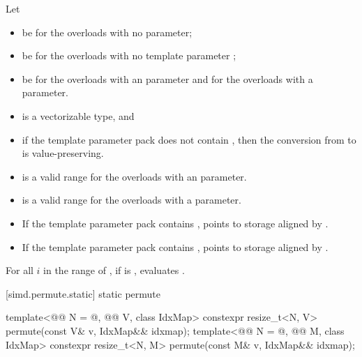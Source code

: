 \begin{itemdescr}
\pnum
Let
\begin{itemize}
 \item
    be  for the
   overloads with no  parameter;
 \item
    be  for the overloads with no
   template parameter ;
 \item
    be  for the overloads with an 
   parameter and  for the overloads with a 
   parameter.
\end{itemize}

\pnum
\mandates
\begin{itemize}
 \item
    is a vectorizable type, and
 \item
   if the template parameter pack  does not contain
   , then the conversion from  to
    is value-preserving.
\end{itemize}

\pnum
\expects
\begin{itemize}
 \item
    is a valid range for the overloads with an
    parameter.
 \item
    is a valid range for the overloads with a 
   parameter.
 \item
   If the template parameter pack  contains
   ,  points to storage
   aligned by .
 \item
   If the template parameter pack  contains
   ,  points to
   storage aligned by .
\end{itemize}

\pnum
\effects
For all $i$ in the range of , if
 is , evaluates
.
\end{itemdescr}

[simd.permute.static]{ static permute}

\begin{itemdecl}
template<@@ N = @\seebelow@, @@ V, class IdxMap>
  constexpr resize_t<N, V> permute(const V& v, IdxMap&& idxmap);
template<@@ N = @\seebelow@, @@ M, class IdxMap>
  constexpr resize_t<N, M> permute(const M& v, IdxMap&& idxmap);
\end{itemdecl}

